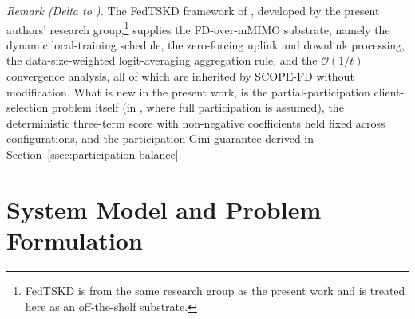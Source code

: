 \documentclass[journal]{IEEEtran}
\begin{document}
\textit{Remark (Delta to \cite{mu2024fedtskd}).} The FedTSKD framework of \cite{mu2024fedtskd}, developed by the present authors' research group,\footnote{FedTSKD \cite{mu2024fedtskd} is from the same research group as the present work and is treated here as an off-the-shelf substrate.} supplies the FD-over-mMIMO substrate, namely the dynamic local-training schedule, the zero-forcing uplink and downlink processing, the data-size-weighted logit-averaging aggregation rule, and the $\mathcal{O}(1/t)$ convergence analysis, all of which are inherited by SCOPE-FD without modification. What is new in the present work, is the partial-participation client-selection problem itself (in \cite{mu2024fedtskd}, where full participation is assumed), the deterministic three-term score with non-negative coefficients held fixed across configurations, and the participation Gini guarantee derived in Section~\ref{ssec:participation-balance}.

\section{System Model and Problem Formulation}
\label{sec:system-model}
\end{document}
